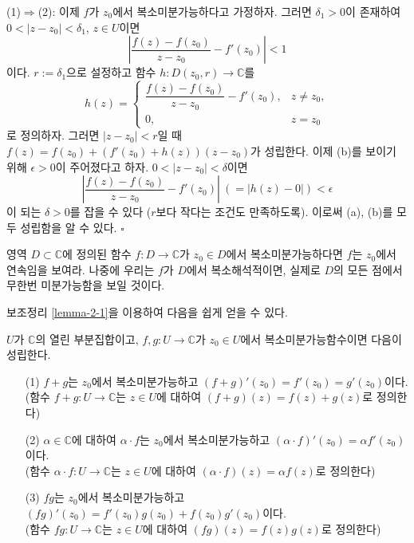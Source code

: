 (1)$\Rightarrow$(2):
이제 $f$가 $z_0$에서 복소미분가능하다고 가정하자. 
그러면 $\delta_1>0$이 존재하여 \\
$0<|z-z_0|<\delta_1$, $z\in U$이면 
\[
\left|  \dfrac{f(z) - f(z_0)}{z - z_0}  - f'(z_0) \right| < 1
\]
이다.
$r:=\delta_1$으로 설정하고 함수 $h:D(z_0,r) \to \mathbb C$를 
\[
h(z) = \begin{cases}
\dfrac{f(z) - f(z_0)}{z - z_0} - f'(z_0), & z\ne z_0, \\
0, & z= z_0
\end{cases}
\]
로 정의하자.
그러면 $|z-z_0|<r$일 때
$f(z) = f(z_0) + \left( f'(z_0) + h(z)\right) (z - z_0)$가 성립한다.
이제 (b)를 보이기 위해 $\epsilon>0$이 주어졌다고 하자.
$0<|z-z_0|<\delta$이면
\[
\left|  \dfrac{f(z) - f(z_0)}{z - z_0}  - f'(z_0) \right| \ \left( = |h(z) - 0| \right) < \epsilon
\]
이 되는 $\delta>0$를 잡을 수 있다 ($r$보다 작다는 조건도 만족하도록).
이로써 (a), (b)를 모두 성립함을 알 수 있다. \hfill $\square$

\begin{salt_exercise} \label{ex-2-3}
영역 $D\subset \mathbb C$에 정의된 함수 $f:D\to \mathbb C$가 
$z_0\in D$에서 복소미분가능하다면 $f$는 $z_0$에서 연속임을 보여라.
나중에 우리는 $f$가 $D$에서 복소해석적이면, 
실제로 $D$의 모든 점에서 무한번 미분가능함을 보일 것이다.
\end{salt_exercise}

보조정리 \ref{lemma-2-1}을 이용하여 다음을 쉽게 얻을 수 있다.

\begin{salt_prop}\label{prop-2-1}
$U$가 $\mathbb C$의 열린 부분집합이고,
$f,g: U\to \mathbb C$가 $z_0\in U$에서 복소미분가능함수이면
다음이 성립한다.
\begin{itemize}
\item[(1)] $f+g$는 $z_0$에서 복소미분가능하고
$(f+g)'(z_0) = f'(z_0) = g'(z_0)$이다. \\
(함수 $f+g:U\to\mathbb C$는 $z\in U$에 대하여 $(f+g)(z) = f(z)+g(z)$로 정의한다)
\item[(2)] $\alpha\in\mathbb C$에 대하여 $\alpha\cdot f$는 $z_0$에서 복소미분가능하고
$(\alpha\cdot f)'(z_0) = \alpha f'(z_0)$이다. \\
(함수 $\alpha \cdot f:U\to\mathbb C$는 $z\in U$에 대하여 
$(\alpha \cdot f)(z) = \alpha f(z)$로 정의한다)
\item[(3)] $fg$는 $z_0$에서 복소미분가능하고
$(fg)'(z_0) = f'(z_0)g(z_0) + f(z_0)g'(z_0)$이다.\\
(함수 $fg:U\to\mathbb C$는 $z\in U$에 대하여 
$(fg)(z)= f(z)g(z)$로 정의한다)
\end{itemize}
\end{salt_prop}


